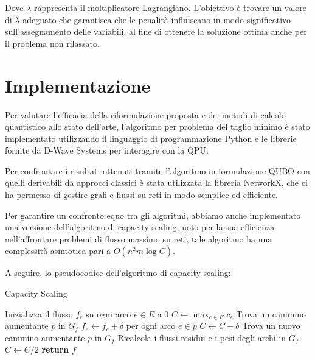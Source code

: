 \documentclass{article}
\begin{document}
Dove $\lambda$ rappresenta il moltiplicatore Lagrangiano. L'obiettivo è trovare un valore di $\lambda$ adeguato che garantisca che le penalità influiscano in modo significativo sull'assegnamento delle variabili, al fine di ottenere la soluzione ottima anche per il problema non rilassato.
\pagebreak

\section{Implementazione}

Per valutare l'efficacia della riformulazione proposta e dei metodi di calcolo quantistico allo stato dell'arte, l'algoritmo per problema del taglio minimo è stato implementato utilizzando il linguaggio di programmazione Python e le librerie fornite da D-Wave Systems per interagire con la QPU\cite{dwave}.

Per confrontare i risultati ottenuti tramite l'algoritmo in formulazione QUBO con quelli derivabili da approcci classici è stata utilizzata la libreria NetworkX\cite{networkx}, che ci ha permesso di gestire grafi e flussi su reti in modo semplice ed efficiente.

Per garantire un confronto equo tra gli algoritmi, abbiamo anche implementato una versione dell'algoritmo di capacity scaling, noto per la sua efficienza nell'affrontare problemi di flusso massimo su reti, tale algoritmo ha una complessità asintotica pari a $O(n^2 m \log C)$.

A seguire, lo pseudocodice dell'algoritmo di capacity scaling:

\begin{algorithm}
\caption{Capacity Scaling}
    \begin{algorithmic}[1]
        \State Inizializza il flusso $f_e$ su ogni arco $e \in E$ a 0
        \State $C \gets \max_{e \in E} c_e$
            \State Trova un cammino aumentante $p$ in $G_f$
                \State $f_e \gets f_e + \delta$ per ogni arco $e \in p$
                \State $C \gets C - \delta$
                \State Trova un nuovo cammino aumentante $p$ in $G_f$
            \EndWhile
            \State Ricalcola i flussi residui e i pesi degli archi in $G_f$
            \State $C \gets C/2$
        \EndWhile
        \State \textbf{return} $f$
    \EndProcedure
\end{algorithmic}
\end{algorithm}
\end{document}
